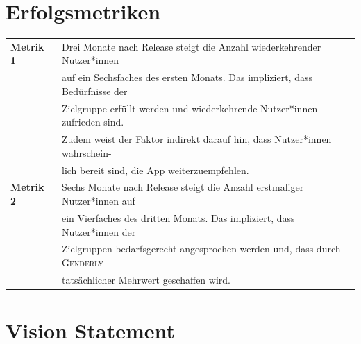 \documentclass[paper=a4, parskip=half]{scrreprt}
\begin{document}
\section{Erfolgsmetriken}
\begin{table}[!htb]
\begin{tabular}{ll}
\textbf{Metrik 1} & Drei Monate nach Release steigt die Anzahl wiederkehrender Nutzer*innen\\
& auf ein Sechsfaches des ersten Monats. Das impliziert, dass Bedürfnisse der\\ %
& Zielgruppe erfüllt werden und wiederkehrende Nutzer*innen zufrieden sind.\\
& Zudem weist der Faktor indirekt darauf hin, dass Nutzer*innen wahrschein-\\
& lich bereit sind, die App weiterzuempfehlen. \vspace{0.15cm} \\ %
\textbf{Metrik 2} & Sechs Monate nach Release steigt die Anzahl erstmaliger Nutzer*innen auf\\
& ein Vierfaches des dritten Monats. Das impliziert, dass Nutzer*innen der\\
& Zielgruppen bedarfsgerecht angesprochen werden und, dass durch \textsc{Genderly} \\
& tatsächlicher Mehrwert geschaffen wird.\vspace{0.15cm} \\
\end{tabular}
\end{table}

\section{Vision Statement} %
\end{document}
